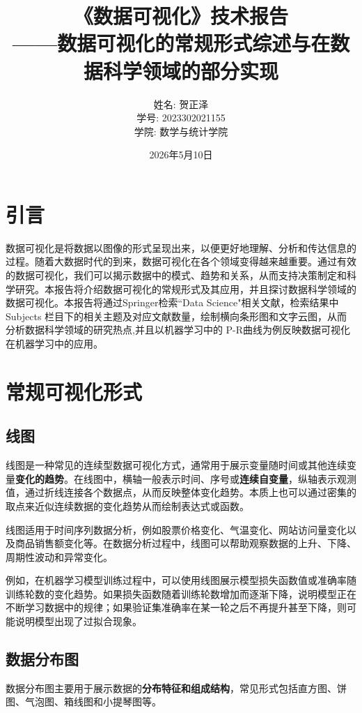 \documentclass[UTF8,12pt]{ctexart}
\title{《数据可视化》技术报告\\[0.3cm] \normalsize ——数据可视化的常规形式综述与在数据科学领域的部分实现}   %
\author{姓名: 贺正泽\\学号: 2023302021155\\学院: 数学与统计学院}
\date{2026年5月10日}
\begin{document}

\maketitle   %
\newpage
\tableofcontents   %
\newpage

\section{引言}
数据可视化是将数据以图像的形式呈现出来，以便更好地理解、分析和传达信息的过程。随着大数据时代的到来，数据可视化在各个领域变得越来越重要。通过有效的数据可视化，我们可以揭示数据中的模式、趋势和关系，从而支持决策制定和科学研究。本报告将介绍数据可视化的常规形式及其应用，并且探讨数据科学领域的数据可视化。本报告将通过Springer检索``Data Science"相关文献，检索结果中 Subjects 栏目下的相关主题及对应文献数量，绘制横向条形图和文字云图，从而分析数据科学领域的研究热点,并且以机器学习中的 P-R曲线为例反映数据可视化在机器学习中的应用。


\section{常规可视化形式}

\subsection{线图}
线图是一种常见的连续型数据可视化方式，通常用于展示变量随时间或其他连续变量\textbf{变化的趋势}。在线图中，横轴一般表示时间、序号或\textbf{连续自变量}，纵轴表示观测值，通过折线连接各个数据点，从而反映整体变化趋势。本质上也可以通过密集的取点来近似连续数据的变化趋势从而绘制表达式或函数。

线图适用于时间序列数据分析，例如股票价格变化、气温变化、网站访问量变化以及商品销售额变化等。在数据分析过程中，线图可以帮助观察数据的上升、下降、周期性波动和异常变化。

例如，在机器学习模型训练过程中，可以使用线图展示模型损失函数值或准确率随训练轮数的变化趋势。如果损失函数随着训练轮数增加而逐渐下降，说明模型正在不断学习数据中的规律；如果验证集准确率在某一轮之后不再提升甚至下降，则可能说明模型出现了过拟合现象。

\subsection{数据分布图}
数据分布图主要用于展示数据的\textbf{分布特征和组成结构}，常见形式包括直方图、饼图、气泡图、箱线图和小提琴图等。
\end{document}
